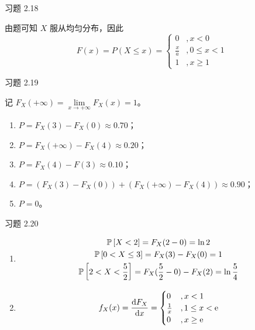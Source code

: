 \begin{problem}
    习题 2.18
    \begin{solution}
        由题可知 $X$ 服从均匀分布，因此
        $$
        F(x) = P(X \le x) = \begin{cases}
            0 &, x < 0 \\
            \frac{x}{a} &, 0 \le x < 1 \\
            1 &, x \ge 1
        \end{cases}
        $$
    \end{solution}
\end{problem}

\begin{problem}
    习题 2.19
    \begin{solution}
        记 $F_X(+ \infty) = \lim\limits_{x \to +\infty} F_X(x) = 1$。
        \begin{enumerate}
            \item[\textbf{1)}] $P = F_X(3) - F_X(0) \approx 0.70$；
            \item[\textbf{2)}] $P = F_X(+ \infty) - F_X(4) \approx 0.20$；
            \item[\textbf{3)}] $P = F_X(4) - F(3) \approx 0.10$；
            \item[\textbf{4)}] $P = (F_X(3) - F_X(0)) + (F_X(+ \infty) - F_X(4)) \approx 0.90$；
            \item[\textbf{5)}] $P = 0$。
        \end{enumerate}
    \end{solution}
\end{problem}

\begin{problem}
    习题 2.20
    \begin{solution}
        \begin{enumerate}
            \item[\textbf{1)}]
            $$
            \begin{gathered}
                \operatorname{\mathbb{P}}\left[X < 2\right] = F_X(2 - 0) = \ln 2 \\
                \operatorname{\mathbb{P}}\left[0 < X \le 3\right] = F_X(3) - F_X(0) = 1 \\
                \operatorname{\mathbb{P}}\left[2 < X < \frac{5}{2}\right] = F_X(\frac{5}{2} - 0) - F_X(2) = \ln \frac{5}{4}
            \end{gathered}
            $$
            \item[\textbf{2)}]
            $$
            f_X(x) = \dv{F_X}{x} = \begin{cases}
                0 &, x < 1 \\
                \frac{1}{x} &, 1 \le x < \mathrm{e} \\
                0 &, x \ge \mathrm{e}
            \end{cases}
            $$
        \end{enumerate}
    \end{solution}
\end{problem}

